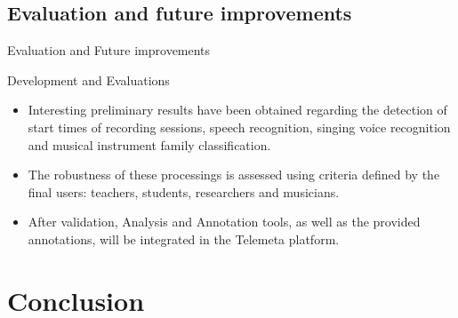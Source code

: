 \documentclass[final, hyperref, table]{beamer}
\begin{document}
\subsection{Evaluation and future improvements}
\begin{frame}{Evaluation and Future improvements}
  \begin{block}{Development and Evaluations}
    \begin{itemize}
    \item Interesting
      preliminary results have been obtained regarding the detection
      of start times of recording sessions, speech recognition,
      singing voice recognition and musical instrument family
      classification.

    \item The robustness of these processings is assessed using \alert{criteria
      defined by the final users}: teachers, students, researchers and
      musicians.
    \item \alert{After validation}, Analysis and Annotation tools, as well as the provided annotations, will be integrated in the Telemeta platform.
    \end{itemize}
  \end{block}
  
    
  \end{frame}


\section{Conclusion}
\end{document}
